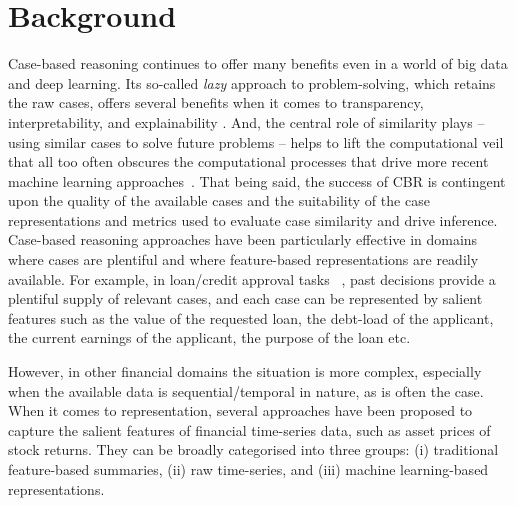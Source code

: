 \documentclass[runningheads]{llncs}
\begin{document}
\section{Background}
Case-based reasoning continues to offer many benefits even in a world of big data and deep learning. Its so-called \emph{lazy} approach to problem-solving, which retains the raw cases, offers several benefits when it comes to transparency, interpretability, and explainability \cite{mcsherry2012lazy}. And, the central role of similarity plays -- using similar cases to solve future problems -- helps to lift the computational veil that all too often obscures the computational processes that drive more recent machine learning approaches~\cite{warren2022better}. That being said, the success of CBR is contingent upon the quality of the available cases and the suitability of the case representations and metrics used to evaluate case similarity and drive inference. Case-based reasoning approaches have been particularly effective in domains where cases are plentiful and where feature-based representations are readily available. For example, in loan/credit approval tasks ~\cite{smyth1995comparison}, past decisions provide a plentiful supply of relevant cases, and each case can be represented by salient features such as the value of the requested loan, the debt-load of the applicant, the current earnings of the applicant, the purpose of the loan etc. 

  

However, in other financial domains the situation is more complex, especially when the available data is sequential/temporal in nature, as is often the case. When it comes to representation, several approaches have been proposed to capture the salient features of financial time-series data, such as asset prices of stock returns. They can be broadly categorised into three groups: (i) traditional feature-based summaries, (ii) raw time-series, and (iii) machine learning-based representations. 
\end{document}

